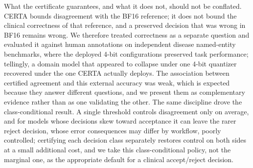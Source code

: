 \documentclass[pdflatex,sn-mathphys-num]{sn-jnl}%
\theoremstyle{thmstyleone}%
\theoremstyle{thmstyletwo}%
\theoremstyle{thmstylethree}%
\begin{document}
What the certificate guarantees, and what it does not, should not be conflated. CERTA bounds
disagreement with the BF16 reference; it does not bound the clinical correctness of that
reference, and a preserved decision that was wrong in BF16 remains wrong. We therefore
treated correctness as a separate question and evaluated it against human annotations on independent
disease named-entity benchmarks, where the deployed 4-bit configurations preserved task performance;
tellingly, a domain model that appeared to collapse under one 4-bit quantizer recovered under the
one CERTA actually deploys. The association between certified agreement and this external accuracy
was weak, which is expected because they answer different questions, and we present them as
complementary evidence rather than as one validating the other. The same discipline drove the
class-conditional result. A single threshold controls disagreement only on average, and for models
whose decisions skew toward acceptance it can leave the rarer reject decision, whose error
consequences may differ by workflow, poorly controlled; certifying each decision class separately restores control on both sides at a
small additional cost, and we take this class-conditional policy, not the marginal one, as the
appropriate default for a clinical accept/reject decision.
 
\end{document}
